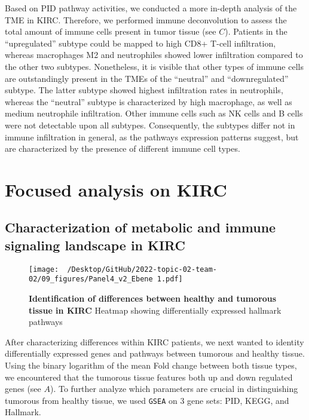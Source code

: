 \documentclass[
  parskip,
  oneside]{scrreprt}
\begin{document}
Based on PID pathway activities, we conducted a more in-depth analysis
of the TME in KIRC. Therefore, we performed immune deconvolution to
assess the total amount of immune cells present in tumor tissue (see
 \(C\)). Patients in the ``upregulated'' subtype could be
mapped to high CD8+ T-cell infiltration, whereas macrophages M2 and
neutrophiles showed lower infiltration compared to the other two
subtypes. Nonetheless, it is visible that other types of immune cells
are outstandingly present in the TMEs of the ``neutral'' and
``downregulated'' subtype. The latter subtype showed highest
infiltration rates in neutrophils, whereas the ``neutral'' subtype is
characterized by high macrophage, as well as medium neutrophile
infiltration. Other immune cells such as NK cells and B cells were not
detectable upon all subtypes. Consequently, the subtypes differ not in
immune infiltration in general, as the pathways expression patterns
suggest, but are characterized by the presence of different immune cell
types.

\hypertarget{focused-analysis-on-kirc}{%
\section{Focused analysis on KIRC}\label{focused-analysis-on-kirc}}

\hypertarget{characterization-of-metabolic-and-immune-signaling-landscape-in-kirc}{%
\subsection{Characterization of metabolic and immune signaling landscape
in
KIRC}\label{characterization-of-metabolic-and-immune-signaling-landscape-in-kirc}}

\begin{figure}[h]
 \begin{center}
   \texttt{[image: ~/Desktop/GitHub/2022-topic-02-team-02/09\_figures/Panel4\_v2\_Ebene 1.pdf]}
  \end{center}
  \caption{\textbf{Identification of differences between healthy and tumorous tissue in KIRC } Heatmap showing differentially expressed hallmark pathways}
  \label{volcano}
\end{figure}

After characterizing differences within KIRC patients, we next wanted to
identity differentially expressed genes and pathways between tumorous
and healthy tissue. Using the binary logarithm of the mean Fold change
between both tissue types, we encountered that the tumorous tissue
features both up and down regulated genes (see  \(A\)).
To further analyze which parameters are crucial in distinguishing
tumorous from healthy tissue, we used \texttt{GSEA} on 3 gene sets: PID,
KEGG, and Hallmark.
\end{document}
